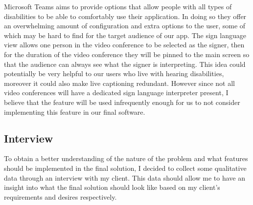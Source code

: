 Microsoft Teams aims to provide options that allow people 
with all types of disabilities to be able to comfortably 
use their application. In doing so they offer an overwhelming
amount of configuration and extra options to the user, some 
of which may be hard to find for the target audience of our 
app. The sign language view allows one person in the video 
conference to be selected as the signer, then for the 
duration of the video conference they will be pinned to the 
main screen so that the audience can always see what the 
signer is interpreting. This idea could potentially be very 
helpful to our users who live with hearing disabilities,
moreover it could also make live captioning redundant.
However since not all video conferences will have a dedicated
sign language interpreter present, I believe that the feature 
will be used infrequently enough for us to not consider 
implementing this feature in our final software.

\subsection{Interview}
\label{sec:interview}

To obtain a better understanding of the nature of the problem
and what features should be implemented in the final solution,
I decided to collect some qualitative data through an 
interview with my client. This data should allow me to have an
insight into what the final solution should look like based
on my client's requirements and desires respectively.


